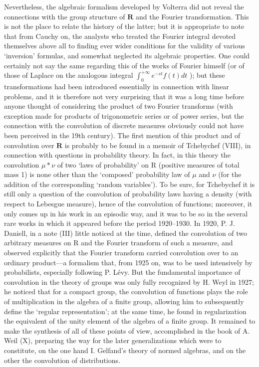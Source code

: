 Nevertheless, the algebraic formalism developed by Volterra did not reveal the connections with the group structure of \(\mathbf{R}\) and the Fourier transformation. This is not the place to relate the history of the latter; but it is appropriate to note that from Cauchy on, the analysts who treated the Fourier integral devoted themselves above all to finding ever wider conditions for the validity of various `inversion' formulas, and somewhat neglected its algebraic properties. One could certainly not say the same regarding this of the works of Fourier himself (or of those of Laplace on the analogous integral \(\int_0^{+\infty}e^{-st}f(t)dt\) ); but these transformations had been introduced essentially in connection with linear problems, and it is therefore not very surprising that it was a long time before anyone thought of considering the product of two Fourier transforms (with exception made for products of trigonometric series or of power series, but the connection with the convolution of discrete measures obviously could not have been perceived in the 19th century). The first mention of this product and of convolution over \(\mathbf{R}\) is probably to be found in a memoir of Tchebychef (VIII), in connection with questions in probability theory. In fact, in this theory the convolution \(\mu *\nu\) of two `laws of probability' on R (positive measures of total mass 1) is none other than the `composed' probability law of \(\mu\) and \(\nu\) (for the addition of the corresponding `random variables'). To be sure, for Tchebychef it is still only a question of the convolution of probability laws having a density (with respect to Lebesgue measure), hence of the convolution of functions; moreover, it only comes up in his work in an episodic way, and it was to be so in the several rare works in which it appeared before the period 1920--1930. In 1920, P. J. Daniell, in a note (III) little noticed at the time, defined the convolution of two arbitrary measures on R and the Fourier transform of such a measure, and observed explicitly that the Fourier transform carried convolution over to an ordinary product---a formalism that, from 1925 on, was to be used intensively by probabilists, especially following P. Lévy. But the fundamental importance of convolution in the theory of groups was only fully recognized by H. Weyl in 1927; he noticed that for a compact group, the convolution of functions plays the role of multiplication in the algebra of a finite group, allowing him to subsequently define the `regular representation'; at the same time, he found in regularization the equivalent of the unity element of the algebra of a finite group. It remained to make the synthesis of all of these points of view, accomplished in the book of A. Weil (X), preparing the way for the later generalizations which were to constitute, on the one hand I. Gelfand's theory of normed algebras, and on the other the convolution of distributions.

